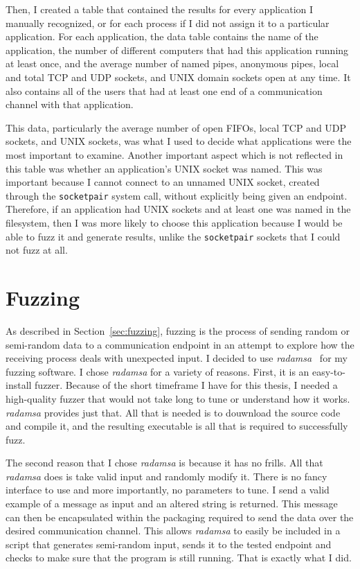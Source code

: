 Then, I created a table that contained the results for every application I manually recognized, or for each process if I did not assign it to a particular application.  For each application, the data table contains the name of the application, the number of different computers that had this application running at least once, and the average number of named pipes, anonymous pipes, local and total TCP and UDP sockets, and UNIX domain sockets open at any time.  It also contains all of the users that had at least one end of a communication channel with that application.

This data, particularly the average number of open FIFOs, local TCP and UDP sockets, and UNIX sockets, was what I used to decide what applications were the most important to examine.  Another important aspect which is not reflected in this table was whether an application's UNIX socket was named.  This was important because I cannot connect to an unnamed UNIX socket, created through the \texttt{socketpair} system call, without explicitly being given an endpoint.  Therefore, if an application had UNIX sockets and at least one was named in the filesystem, then I was more likely to choose this application because I would be able to fuzz it and generate results, unlike the \texttt{socketpair} sockets that I could not fuzz at all.

\section{Fuzzing}
\label{sec:fuzzingMethods}
As described in Section~\ref{sec:fuzzing}, fuzzing is the process of sending random or semi-random data to a communication endpoint in an attempt to explore how the receiving process deals with unexpected input.  I decided to use \textit{radamsa}~\cite{radamsa} for my fuzzing software.  I chose \textit{radamsa} for a variety of reasons.  First, it is an easy-to-install fuzzer.  Because of the short timeframe I have for this thesis, I needed a high-quality fuzzer that would not take long to tune or understand how it works.  \textit{radamsa} provides just that.  All that is needed is to douwnload the source code and compile it, and the resulting executable is all that is required to successfully fuzz.

The second reason that I chose \textit{radamsa} is because it has no frills.  All that \textit{radamsa} does is take valid input and randomly modify it.  There is no fancy interface to use and more importantly, no parameters to tune.  I send a valid example of a message as input and an altered string is returned.  This message can then be encapsulated within the packaging required to send the data over the desired communication channel.  This allows \textit{radamsa} to easily be included in a script that generates semi-random input, sends it to the tested endpoint and checks to make sure that the program is still running.  That is exactly what I did.

